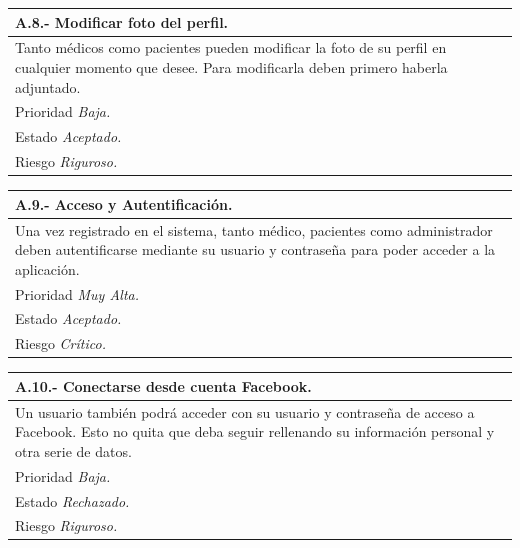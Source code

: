 \documentclass[a4paper,oneside,11pt]{book}
\begin{document}
\begin{center}
\begin{tabulary}{15cm}{|L|}
	\hline
		\bf{A.8.- Modificar foto del perfil.} \\
	\hline
		Tanto médicos como pacientes pueden modificar la foto de su perfil en cualquier momento que desee. Para modificarla deben primero haberla adjuntado. \\
	\hline
		Prioridad \textit{Baja.} \\
	\hline
		Estado \textit{Aceptado.} \\
	\hline
		Riesgo \textit{Riguroso.} \\
	\hline
\end{tabulary}
\end{center}

\begin{center}
\begin{tabulary}{15cm}{|L|}
	\hline
		\bf{A.9.- Acceso y Autentificación.} \\
	\hline
		Una vez registrado en el sistema, tanto médico, pacientes como administrador deben autentificarse mediante su usuario y contraseña para poder acceder a la aplicación. \\
	\hline
		Prioridad \textit{Muy Alta.} \\
	\hline
		Estado \textit{Aceptado.} \\
	\hline
		Riesgo \textit{Crítico.} \\
	\hline
\end{tabulary}
\end{center}

\begin{center}
\begin{tabulary}{15cm}{|L|}
	\hline
		\bf{A.10.- Conectarse desde cuenta Facebook.} \\
	\hline
		Un usuario también podrá acceder con su usuario y contraseña de acceso a Facebook. Esto no quita que deba seguir rellenando su información personal y otra serie de datos. \\
	\hline
		Prioridad \textit{Baja.} \\
	\hline
		Estado \textit{Rechazado.} \\
	\hline
		Riesgo \textit{Riguroso.} \\
	\hline
\end{tabulary}
\end{center}
\end{document}
